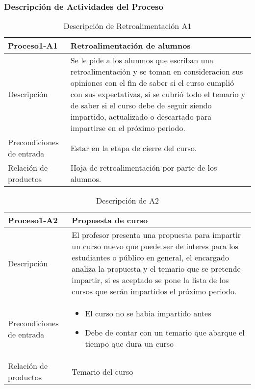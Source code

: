 \newpage
\subsubsection{Descripción de Actividades del Proceso}		%



\begin{table}[H]
\centering
	\begin{tabular}{p{5cm} p{11cm}}
		\hline
			\textbf{Proceso1-A1} & \textbf{Retroalimentaci\'on de alumnos}\\
		\hline\hline
			Descripción & Se le pide a los alumnos que escriban una retroalimentaci\'on y se toman en consideracion sus opiniones con el fin de saber si el curso cumpli\'o con sus expectativas, si se cubri\'o todo el temario y de saber si el curso debe de seguir siendo impartido, actualizado o descartado para impartirse en el pr\'oximo periodo.\\
		\hline
			Precondiciones de entrada & Estar en la etapa de cierre del curso.\\					
		\hline
			Relación de productos & Hoja de retroalimentaci\'on por parte de los alumnos.\\
		\hline
	\end{tabular}
\caption{Descripción de Retroalimentaci\'on A1}
\end{table}

\begin{table}[H]
	\centering
	\begin{tabular}{p{5cm} p{11cm}}
		\hline
		\textbf{Proceso1-A2} & \textbf{Propuesta de curso}\\
		\hline\hline
		Descripción & El profesor presenta una propuesta para impartir un curso nuevo que puede ser de interes para los estudiantes o p\'ublico en general, el encargado analiza la propuesta y el temario que se pretende impartir, si es aceptado se pone la lista de los cursos que ser\'an impartidos el pr\'oximo periodo.\\
		\hline
		Precondiciones de entrada & 
		
		\begin{itemize}
			\item El curso no se habia impartido antes
			\item Debe de contar con un temario que abarque el tiempo que dura un curso
		\end{itemize}
		
		 \\					
		\hline
		Relación de productos & Temario del curso\\
		\hline
	\end{tabular}
	\caption{Descripción de  A2}
\end{table}


